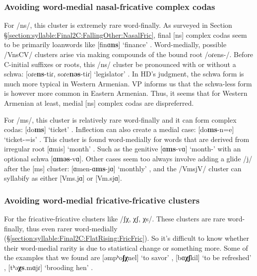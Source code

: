 	\subsubsection{Avoiding word-medial nasal-fricative  complex codas }\label{section:syllable:OtherCodaRestrictions:AvoidMedial:NasalFric}
	
	
	For /ns/, this cluster is extremely rare word-finally. As surveyed in Section \S\ref{section:syllable:Final2C:FallingOther:NasalFric}, final [ns] complex codas seem to be primarily loanwords like [finɑ\textbf{ns}] `finance' . Word-medially, possible /VnsCV/ clusters arise via making compounds of the bound root /oɾens-/. Before C-initial suffixes or roots, this /ns/ cluster be pronounced with or without a schwa: [oɾe\textbf{ns}-tiɾ, soɾe\textbf{nəs}-tiɾ] `legislator' . In HD's judgment, the schwa form is much more typical in Western Armenian. VP informs us that the schwa-less form is however more common in Eastern Armenian.  Thus, it seems that for Western Armenian at least, medial [ns] complex codas are dispreferred. 
	
	For /ms/, this cluster is relatively rare word-finally and it can form complex codas: [do\textbf{ms}] `ticket' . Inflection can also create a medial case:  [do\textbf{ms}-n=e] `ticket-{}=is' . This cluster is found     word-medially for words that are derived from irregular root   [ɑmis] `month' . Such as the genitive    [ɑ\textbf{ms}-vɑ] `month-{\gen}'  with an optional schwa  [ɑ\textbf{məs}-vɑ].  Other cases seem too always involve adding a glide /j/ after the [ms] cluster: [ɑmen-ɑ\textbf{ms}-jɑ] `monthly' , and the /VmsjV/ cluster can syllabify as either [Vms.jɑ] or [Vm.sjɑ]. 
	\subsubsection{Avoiding word-medial fricative-fricative clusters   }\label{section:syllable:OtherCodaRestrictions:AvoidMedial:FricFric}
	
	For the fricative-fricative clusters  like /ʃχ, χʃ, χs/.   These clusters are rare word-finally, thus even rarer word-medially (\S\ref{section:syllable:Final2C:FlatRising:FricFric}). So it's difficult to know whether their word-medial rarity is due to statistical change or something more. Some of the examples that we found are  [əmpʰo\textbf{ʃχ}nel] `to savor' , [bɑ\textbf{χʃ}kil] `to be refreshed' , [tʰə\textbf{χs}.mɑjɾ] `brooding hen' . 
	
